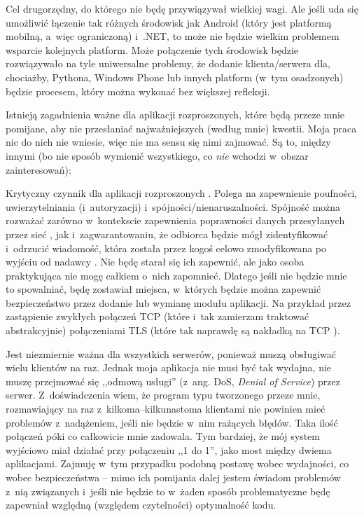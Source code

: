 \begin{description}
Cel drugorzędny, do którego nie będę przywiązywał wielkiej wagi. Ale jeśli uda się umożliwić łączenie tak różnych środowisk jak Android (który jest platformą mobilną, a~więc ograniczoną) i~.NET, to może nie będzie wielkim problemem wsparcie kolejnych platform. Może połączenie tych środowisk będzie rozwiązywało na tyle uniwersalne problemy, że dodanie klienta/serwera dla, chociażby, Pythona, Windows Phone lub innych platform (w~tym osadzonych) będzie procesem, który można wykonać bez większej refleksji. 
\end{description}

Istnieją zagadnienia ważne dla aplikacji rozproszonych, które będą przeze mnie pomijane, aby nie przesłaniać najważniejszych (według mnie) kwestii. Moja praca nic do nich nie wniesie, więc nie ma sensu się nimi zajmować. Są to, między innymi (bo nie sposób wymienić wszystkiego, co \emph{nie} wchodzi w~obszar zainteresowań):

\begin{description}
Krytyczny czynnik dla aplikacji rozproszonych \cite[str.~21]{web-services}. Polega na zapewnienie poufności, uwierzytelniania (i~autoryzacji) i~spójności/nienaruszalności. Spójność można rozważać zarówno w~kontekscie zapewnienia poprawności danych przesyłanych przez sieć \cite{data-integrity}, jak i~zagwarantowaniu, że odbiorca będzie mógł zidentyfikować i~odrzucić wiadomość, która została przez kogoś celowo zmodyfikowana po wyjściu od nadawcy \cite{data-signature}. Nie będę starał się ich zapewnić, ale jako osoba praktykująca nie mogę całkiem o~nich zapomnieć. Dlatego jeśli nie będzie mnie to spowalniać, będę zostawiał miejsca, w~których będzie można zapewnić bezpieczeństwo przez dodanie lub wymianę modułu aplikacji. Na przykład przez zastąpienie zwykłych połączeń TCP (które i~tak zamierzam traktować abstrakcyjnie) połączeniami TLS (które tak naprawdę są nakładką na TCP \cite[str.~47]{tls}).

Jest niezmiernie ważna dla wszystkich serwerów, ponieważ muszą obsługiwać wielu klientów na raz. Jednak moja aplikacja nie musi być tak wydajna, nie muszę przejmować się ,,odmową usługi'' \cite{dos}(z~ang. DoS, \emph{Denial of Service}) przez serwer. Z~doświadczenia wiem, że program typu tworzonego przeze mnie, rozmawiający na raz z~kilkoma--kilkunastoma klientami nie powinien mieć problemów z~nadążeniem, jeśli nie będzie w~nim rażących błędów. Taka ilość połączeń póki co całkowicie mnie zadowala. Tym bardziej, że mój system wyjściowo miał działać przy połączeniu ,,1 do 1'', jako most między dwiema aplikacjami. Zajmuję w~tym przypadku podobną postawę wobec wydajności, co wobec bezpieczeństwa -- mimo ich pomijania dalej jestem świadom problemów z~nią związanych i~jeśli nie będzie to w~żaden sposób problematyczne będę zapewniał względną (względem czytelności) optymalność kodu.
\end{description}

